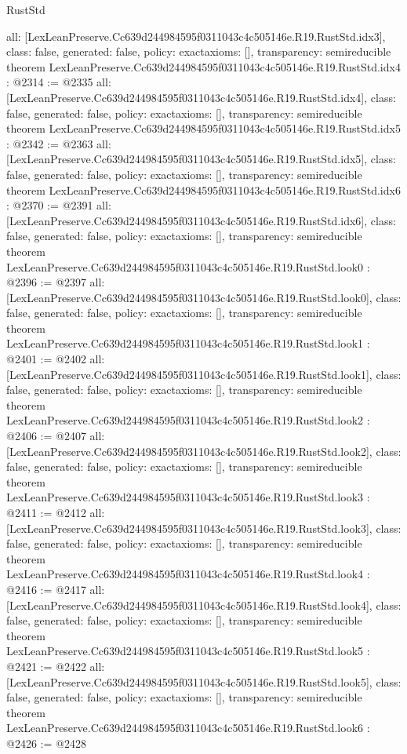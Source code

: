 \begin{lexlean}{RustStd}
\begin{coremodule}
{  all: [LexLeanPreserve.Cc639d244984595f0311043c4c505146e.R19.RustStd.idx3],
  class: false,
  generated: false,
  policy: exact{axioms: []},
  transparency: semireducible
}
theorem LexLeanPreserve.Cc639d244984595f0311043c4c505146e.R19.RustStd.idx4 : @2314 := @2335 {
  all: [LexLeanPreserve.Cc639d244984595f0311043c4c505146e.R19.RustStd.idx4],
  class: false,
  generated: false,
  policy: exact{axioms: []},
  transparency: semireducible
}
theorem LexLeanPreserve.Cc639d244984595f0311043c4c505146e.R19.RustStd.idx5 : @2342 := @2363 {
  all: [LexLeanPreserve.Cc639d244984595f0311043c4c505146e.R19.RustStd.idx5],
  class: false,
  generated: false,
  policy: exact{axioms: []},
  transparency: semireducible
}
theorem LexLeanPreserve.Cc639d244984595f0311043c4c505146e.R19.RustStd.idx6 : @2370 := @2391 {
  all: [LexLeanPreserve.Cc639d244984595f0311043c4c505146e.R19.RustStd.idx6],
  class: false,
  generated: false,
  policy: exact{axioms: []},
  transparency: semireducible
}
theorem LexLeanPreserve.Cc639d244984595f0311043c4c505146e.R19.RustStd.look0 : @2396 := @2397 {
  all: [LexLeanPreserve.Cc639d244984595f0311043c4c505146e.R19.RustStd.look0],
  class: false,
  generated: false,
  policy: exact{axioms: []},
  transparency: semireducible
}
theorem LexLeanPreserve.Cc639d244984595f0311043c4c505146e.R19.RustStd.look1 : @2401 := @2402 {
  all: [LexLeanPreserve.Cc639d244984595f0311043c4c505146e.R19.RustStd.look1],
  class: false,
  generated: false,
  policy: exact{axioms: []},
  transparency: semireducible
}
theorem LexLeanPreserve.Cc639d244984595f0311043c4c505146e.R19.RustStd.look2 : @2406 := @2407 {
  all: [LexLeanPreserve.Cc639d244984595f0311043c4c505146e.R19.RustStd.look2],
  class: false,
  generated: false,
  policy: exact{axioms: []},
  transparency: semireducible
}
theorem LexLeanPreserve.Cc639d244984595f0311043c4c505146e.R19.RustStd.look3 : @2411 := @2412 {
  all: [LexLeanPreserve.Cc639d244984595f0311043c4c505146e.R19.RustStd.look3],
  class: false,
  generated: false,
  policy: exact{axioms: []},
  transparency: semireducible
}
theorem LexLeanPreserve.Cc639d244984595f0311043c4c505146e.R19.RustStd.look4 : @2416 := @2417 {
  all: [LexLeanPreserve.Cc639d244984595f0311043c4c505146e.R19.RustStd.look4],
  class: false,
  generated: false,
  policy: exact{axioms: []},
  transparency: semireducible
}
theorem LexLeanPreserve.Cc639d244984595f0311043c4c505146e.R19.RustStd.look5 : @2421 := @2422 {
  all: [LexLeanPreserve.Cc639d244984595f0311043c4c505146e.R19.RustStd.look5],
  class: false,
  generated: false,
  policy: exact{axioms: []},
  transparency: semireducible
}
theorem LexLeanPreserve.Cc639d244984595f0311043c4c505146e.R19.RustStd.look6 : @2426 := @2428 {
}
\end{coremodule}
\end{lexlean}
